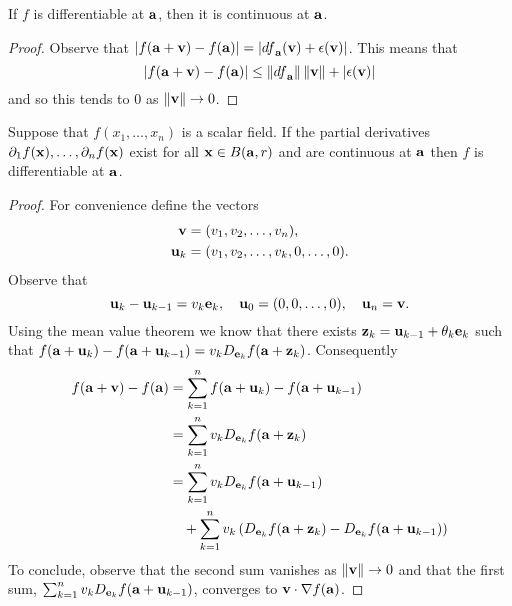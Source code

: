 \begin{theorem*}
    If \(f\) is differentiable at \(\aa\), then it is continuous at \(\aa\).
\end{theorem*}
\begin{proof}
    Observe that \(\abs{f(\aa+\vv)-f(\aa)} = \abs{   {df}_{\aa}(\vv) + \epsilon(\vv)  }\).
    This means that 
    \[
        \abs{f(\aa+\vv)-f(\aa)} \leq \norm{  {df}_{\aa} } \norm{\vv} + \abs{\epsilon(\vv)} 
    \] 
    and so this tends to \(0\) as \(\norm{\vv} \to 0\).
\end{proof}

\begin{theorem}
    Suppose that \(f(x_1,\ldots,x_n)\) is a scalar field.
    If the partial derivatives \(\partial_1 f(\xx), \ldots, \partial_n f(\xx)\) exist for all \(\xx\in B(\aa,r)\) and are continuous at \(\aa\) then \(f\) is differentiable at \(\aa\).
\end{theorem}

\begin{proof}
    For convenience define the vectors 
    \[
        \begin{aligned}
            \vv &= (v_1,v_2,\ldots,v_n), \\
            \uu_k &= (v_1,v_2,\ldots,v_k,0,\ldots,0).
        \end{aligned}
    \]
    Observe that
    \[
        \uu_k - \uu_{k-1} = v_k \ee_k,
        \quad
        \uu_0 = (0,0,\ldots,0),
        \quad
        \uu_n = \vv.
    \]
    Using the mean value theorem we know that there exists \( \zz_k = \uu_{k-1}+ \theta_k \ee_k\) such that \( f(\aa + \uu_k) - f(\aa + \uu_{k-1}) =  v_k  D_{\ee_k}f(\aa +  \zz_k) \).
    Consequently
    \[
        \begin{aligned}
            f(\aa+\vv) - f(\aa)
             & = \sum_{k=1}^{n} f(\aa + \uu_k) - f(\aa + \uu_{k-1})                                               \\
             & = \sum_{k=1}^{n} v_k  D_{\ee_k}f(\aa +  \zz_k)                                                     \\
             & = \sum_{k=1}^{n} v_k  D_{\ee_k}f(\aa + \uu_{k-1})                                                  \\
             & \quad + \sum_{k=1}^{n}  v_k \left(  D_{\ee_k}f(\aa +  \zz_k)-  D_{\ee_k}f(\aa + \uu_{k-1}) \right)
        \end{aligned}
    \]
    To conclude, observe that the second sum vanishes as \(\norm{\vv} \to 0\) and that the first sum,
    \(\sum_{k=1}^{n} v_k  D_{\ee_k}f(\aa + \uu_{k-1})\), converges to \(\vv \cdot \nabla f(\aa)\).
\end{proof}



